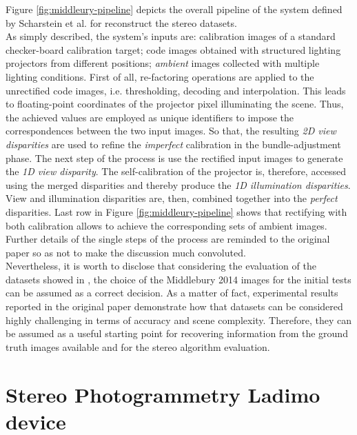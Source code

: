 Figure \ref{fig:middleury-pipeline} depicts the overall pipeline of the system defined by Scharstein et al. \cite{Scharstein2014} for reconstruct the stereo datasets.\\
As simply described, the system's inputs are: calibration images of a standard checker-board calibration target; code images obtained with structured lighting projectors from different positions; \textit{ambient} images collected with multiple lighting conditions. 
First of all, re-factoring operations are applied to the unrectified code images, i.e. thresholding, decoding and interpolation.
This leads to floating-point coordinates of the projector pixel illuminating the scene. 
Thus, the achieved values are employed as unique identifiers to impose the correspondences between the two input images. 
So that, the resulting \textit{2D view disparities} are used to refine the \textit{imperfect} calibration in the bundle-adjustment phase.
The next step of the process is use the rectified input images to generate the \textit{1D view disparity}.
The self-calibration of the projector is, therefore, accessed using the merged disparities and thereby produce the \textit{1D illumination disparities}.
View and illumination disparities are, then, combined together into the \textit{perfect} disparities. 
Last row in Figure \ref{fig:middleury-pipeline} shows that rectifying with both calibration allows to achieve the corresponding sets of ambient images.\\
Further details of the single steps of the process are reminded to the original paper \cite{Scharstein2014} so as not to make the discussion much convoluted.\\
Nevertheless, it is worth to disclose that considering the evaluation of the datasets showed in \cite{Scharstein2014}, the choice of the Middlebury 2014 images for the initial tests can be assumed as a correct decision.
As a matter of fact, experimental results reported in the original paper demonstrate how that datasets can be considered highly challenging in terms of accuracy and scene complexity.
Therefore, they can be assumed as a useful starting point for recovering information from the ground truth images available and for the stereo algorithm evaluation.\\

\section{Stereo Photogrammetry Ladimo device}
\label{section:stereo-device}

